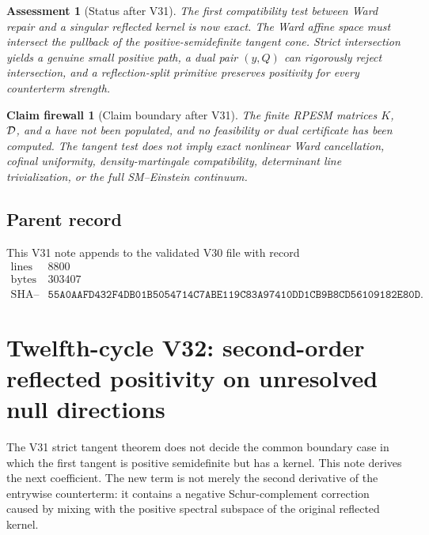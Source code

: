 \documentclass[11pt]{article}
\newtheorem{firewall}[theorem]{Claim firewall}
\newtheorem{assessment}[theorem]{Assessment}
\theoremstyle{remark}
\begin{document}
\begin{assessment}[Status after V31]
\label{ass:v12v31-status}
The first compatibility test between Ward repair and a singular
reflected kernel is now exact.  The Ward affine space must intersect
the pullback of the positive-semidefinite tangent cone.  Strict
intersection yields a genuine small positive path, a dual pair
\((y,Q)\) can rigorously reject intersection, and a
reflection-split primitive preserves positivity for every
counterterm strength.
\end{assessment}

\begin{firewall}[Claim boundary after V31]
\label{fire:v12v31-claim}
The finite RPESM matrices \(K\), \({\cal D}\), and \(a\) have not been
populated, and no feasibility or dual certificate has been computed.
The tangent test does not imply exact nonlinear Ward cancellation,
cofinal uniformity, density-martingale compatibility, determinant
line trivialization, or the full SM--Einstein continuum.
\end{firewall}

\subsection{Parent record}

This V31 note appends to the validated V30 file with record
\[
\begin{array}{c|c}
\text{lines}&8800\\
\text{bytes}&303407\\
\text{SHA--256}&
\texttt{55A0AAFD432F4DB01B5054714C7ABE119C83A97410DD1CB9B8CD56109182E80D}.
\end{array}
\]


\section{Twelfth-cycle V32: second-order reflected positivity on
unresolved null directions}
\label{sec:v12v32}

The V31 strict tangent theorem does not decide the common boundary
case in which the first tangent is positive semidefinite but has a
kernel.  This note derives the next coefficient.  The new term is not
merely the second derivative of the entrywise counterterm: it contains
a negative Schur-complement correction caused by mixing with the
positive spectral subspace of the original reflected kernel.
\end{document}
